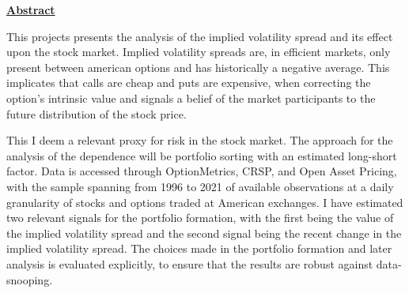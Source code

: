 
\vspace*{2cm}
\begin{center}
\underline{\large\textbf{Abstract}}
\end{center}

This projects presents the analysis of the implied volatility spread and its effect upon the stock market. Implied volatility spreads are, in efficient markets, only present between american options and has historically a negative average. This implicates %
that calls are cheap and puts are expensive, when correcting the option's intrinsic value and signals a belief of the market participants to the future distribution of the stock price. 

This I deem a relevant proxy for risk in the stock market. The approach for the analysis of the dependence will be portfolio sorting with an estimated long-short factor. Data is accessed through OptionMetrics, CRSP, and Open Asset Pricing, with the sample spanning from 1996 to 2021 of available observations at a daily granularity of stocks and options traded at American exchanges. I have estimated two relevant signals for the portfolio formation, with the first being the value of the implied volatility spread and the second signal being the recent change in the implied volatility spread. The choices made in the portfolio formation and later analysis is evaluated explicitly, to ensure that the results are robust against data-snooping. 




